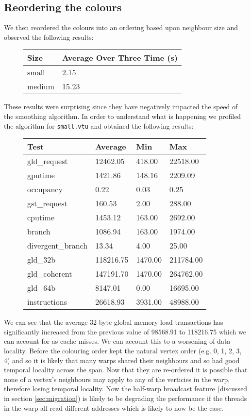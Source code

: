\subsection{Reordering the colours}
We then reordered the colours into an ordering based upon neighbour size and observed the following results:\\
\begin{figure}[H]\centering \begin{tabular}{ l | l }
  \hline
  Size & Average Over Three Time (s) \\
  \hline
  \hline
  small & 2.15 \\
  medium & 15.23 \\
  \hline
\end{tabular} \end{figure}

These results were surprising since they have negatively impacted the speed of the smoothing algorithm. In order to understand what is happening we profiled the algorithm for \texttt{small.vtu} and obtained the following results:\\

\begin{figure}[H]\centering \begin{tabular}{ l | l | l | l}
\hline
Test & Average & Min & Max \\
\hline
\hline
gld\_request & 12462.05 & 418.00 & 22518.00 \\
gputime & 1421.86 & 148.16 & 2209.09 \\
occupancy & 0.22 & 0.03 & 0.25 \\
gst\_request & 160.53 & 2.00 & 288.00 \\
cputime & 1453.12 & 163.00 & 2692.00 \\
branch & 1086.94 & 163.00 & 1974.00 \\
divergent\_branch & 13.34 & 4.00 & 25.00 \\
gld\_32b & 118216.75 & 1470.00 & 211784.00 \\
gld\_coherent & 147191.70 & 1470.00 & 264762.00 \\
gld\_64b & 8147.01 & 0.00 & 16695.00 \\
instructions & 26618.93 & 3931.00 & 48988.00 \\
\hline
\end{tabular} \end{figure}

We can see that the average 32-byte global memory load transactions has significantly increased from the previous value of 98568.91 to 118216.75 which we can account for as cache misses. We can account this to a worsening of data locality. Before the colouring order kept the natural vertex order (e.g. 0, 1, 2, 3, 4) and so it is likely that many warps shared their neighbours and so had good temporal locality across the span.
Now that they are re-ordered it is possible that none of a vertex's neighbours may apply to any of the verticies in the warp, therefore losing temporal locality.
Now the half-warp broadcast feature (discussed in section \ref{sec:migration}) is likely to be degrading the performance if the
threads in the warp all read different addresses which is likely to now be the case.
